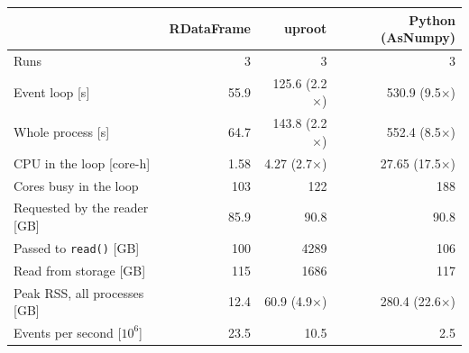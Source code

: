 \begin{tabular}{lrrr}
\toprule
 & RDataFrame & uproot & Python (AsNumpy) \\
\midrule
Runs & 3 & 3 & 3 \\
Event loop [s] & 55.9 & 125.6 (2.2$\times$) & 530.9 (9.5$\times$) \\
Whole process [s] & 64.7 & 143.8 (2.2$\times$) & 552.4 (8.5$\times$) \\
CPU in the loop [core-h] & 1.58 & 4.27 (2.7$\times$) & 27.65 (17.5$\times$) \\
Cores busy in the loop & 103 & 122 & 188 \\
Requested by the reader [GB] & 85.9 & 90.8 & 90.8 \\
Passed to \texttt{read()} [GB] & 100 & 4289 & 106 \\
Read from storage [GB] & 115 & 1686 & 117 \\
Peak RSS, all processes [GB] & 12.4 & 60.9 (4.9$\times$) & 280.4 (22.6$\times$) \\
Events per second [$10^6$] & 23.5 & 10.5 & 2.5 \\
\bottomrule
\end{tabular}
